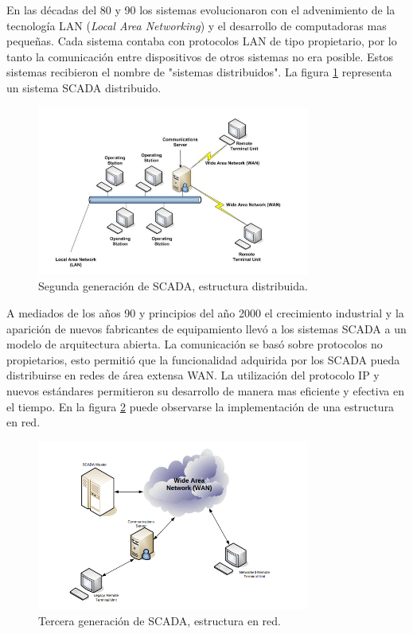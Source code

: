 En las décadas del 80 y 90 los sistemas evolucionaron con el advenimiento de la tecnología LAN (\textit{Local Area Networking}) y el desarrollo de computadoras mas pequeñas. Cada sistema contaba con protocolos LAN de tipo propietario, por lo tanto  la comunicación entre dispositivos de otros sistemas no era posible. Estos sistemas recibieron el nombre de "sistemas distribuidos". La figura \ref{fig:SCDIS} representa un sistema SCADA distribuido.

\begin{figure}[htbp]
	\centering
	\includegraphics[width=0.8\textwidth]{./Figures/SCADA_DISTRIBUIDO.png}
	\caption{Segunda generación de SCADA, estructura distribuida.\citep{BOOK:2}}
	\label{fig:SCDIS}
\end{figure}

A mediados de los años 90 y principios del año 2000 el crecimiento industrial y la aparición de nuevos fabricantes de equipamiento llevó a los sistemas SCADA a un modelo de arquitectura abierta. La comunicación se basó sobre protocolos no propietarios, esto permitió que la funcionalidad adquirida por los SCADA pueda distribuirse en redes de área extensa WAN. La utilización del protocolo IP y nuevos estándares permitieron su desarrollo de manera mas eficiente y efectiva en el tiempo. En la figura \ref{fig:SCNET} puede observarse la implementación de una estructura en red.

\begin{figure}[htbp]
	\centering
	\includegraphics[width=0.8\textwidth]{./Figures/SCADA_NETWORKED.png}
	\caption{Tercera generación de SCADA, estructura en red.\citep{BOOK:2}}
	\label{fig:SCNET}
\end{figure}

